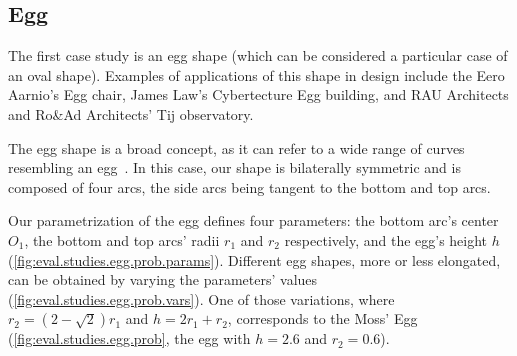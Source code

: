 \subsection{Egg}%
\label{sec:eval.studies.egg}

The first case study is an egg shape (which can be considered a particular case
of an oval shape).  Examples of applications of this shape in design include the
Eero Aarnio's Egg chair, James Law's Cybertecture Egg building, and RAU
Architects and Ro\&Ad Architects' Tij observatory.

The egg shape is a broad concept, as it can refer to a wide range of curves
resembling an egg~\cite{Dixon:1991:Mathographics}.  In this case, our shape is
bilaterally symmetric and is composed of four arcs, the side arcs being tangent
to the bottom and top arcs.

Our parametrization of the egg defines four parameters: the bottom arc's center
$O_1$, the bottom and top arcs' radii $r_1$ and $r_2$ respectively, and the
egg's height $h$ (\cref{fig:eval.studies.egg.prob.params}).  Different egg
shapes, more or less elongated, can be obtained by varying the parameters'
values (\cref{fig:eval.studies.egg.prob.vars}).  One of those variations, where
$r_2 = (2 - \sqrt2)r_1$ and $h = 2r_1 + r_2$, corresponds to the Moss' Egg
(\cref{fig:eval.studies.egg.prob}, the egg with $h = 2.6$ and $r_2 = 0.6$).

